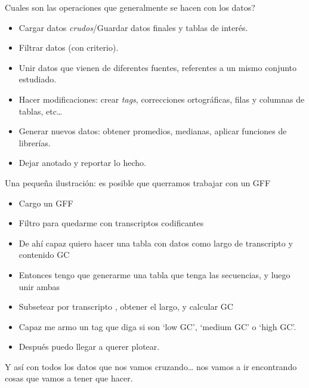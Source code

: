 \documentclass[ignorenonframetext,]{beamer}
\providecommand{\tightlist}{%
  \setlength{\itemsep}{0pt}\setlength{\parskip}{0pt}}
\begin{document}
\begin{frame}{Cuales son las operaciones que generalmente se hacen con
los datos?}
\protect\hypertarget{cuales-son-las-operaciones-que-generalmente-se-hacen-con-los-datos}{}

\begin{itemize}
\tightlist
\item
  Cargar datos \emph{crudos}/Guardar datos finales y tablas de interés.
\item
  Filtrar datos (con criterio).
\item
  Unir datos que vienen de diferentes fuentes, referentes a un mismo
  conjunto estudiado.
\item
  Hacer modificaciones: crear \emph{tags}, correcciones ortográficas,
  filas y columnas de tablas, etc\ldots{}
\item
  Generar nuevos datos: obtener promedios, medianas, aplicar funciones
  de librerías.
\item
  Dejar anotado y reportar lo hecho.
\end{itemize}

\end{frame}

\begin{frame}{Una pequeña ilustración: es posible que querramos trabajar
con un GFF}
\protect\hypertarget{una-pequeuxf1a-ilustraciuxf3n-es-posible-que-querramos-trabajar-con-un-gff}{}

\begin{itemize}
\tightlist
\item
  Cargo un GFF
\item
  Filtro para quedarme con transcriptos codificantes
\item
  De ahí capaz quiero hacer una tabla con datos como largo de
  transcripto y contenido GC
\item
  Entonces tengo que generarme una tabla que tenga las secuencias, y
  luego unir ambas
\item
  Subsetear por transcripto , obtener el largo, y calcular GC
\item
  Capaz me armo un tag que diga si son `low GC', `medium GC' o `high
  GC'.
\item
  Después puedo llegar a querer plotear.
\end{itemize}

Y así con todos los datos que nos vamos cruzando\ldots{} nos vamos a ir
encontrando cosas que vamos a tener que hacer.

\end{frame}
\end{document}
